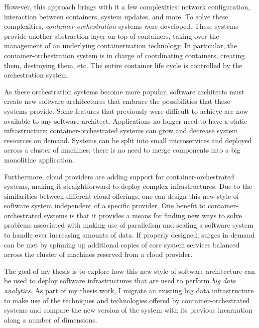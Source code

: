 However, this approach brings with it a few complexities: network configuration, interaction between containers, system updates, and more. To solve these complexities, \textit{container-orchestration} systems were developed. These systems provide another abstraction layer on top of containers, taking over the management of an underlying containerization technology. In particular, the container-orchestration system is in charge of coordinating containers, creating them, destroying them, etc. The entire container life cycle is controlled by the orchestration system.

As these orchestration systems become more popular, software architects must create new software architectures that embrace the  possibilities that these systems provide. Some features that previously were difficult to achieve are now available to any software architect. Applications no longer need to have a static infrastructure: container-orchestrated systems can grow and decrease system resources on demand. Systems can be split into small microservices and deployed across a cluster of machines; there is no need to merge components into a big monolithic application.

Furthermore, cloud providers are adding support for container-orchestrated systems, making it straightforward to deploy complex infrastructures. Due to the similarities between different cloud offerings, one can design this new style of software system independent of a specific provider. One benefit to container-orchestrated systems is that it provides a means for finding new ways to solve problems associated with making use of parallelism and scaling a software system to handle ever increasing amounts of data. If properly designed, surges in demand can be met by spinning up additional copies of core system services balanced across the cluster of machines reserved from a cloud provider.

The goal of my thesis is to explore how this new style of software architecture can be used to deploy software infrastructures that are used to perform \textit{big data analytics}. As part of my thesis work, I migrate an existing big data infrastructure to make use of the techniques and technologies offered by container-orchestrated systems and compare the new version of the system with its previous incarnation along a number of dimensions.
